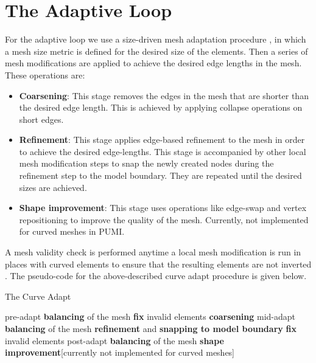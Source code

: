 \documentclass[review,12pt]{elsarticle_summary_report}
\begin{document}

\section{\label{adaptive_loop}The Adaptive Loop}

For the adaptive loop we use a size-driven mesh adaptation procedure \cite{LiShephard_03}, in which a mesh size metric is defined for the desired size of the elements. Then a series of mesh modifications are applied to achieve the desired edge lengths in the mesh. These operations are:
\begin{itemize}
  \item \textbf{Coarsening}: This stage removes the edges in the mesh that are shorter than the desired edge length. This is achieved by applying collapse operations on short edges.
  \item \textbf{Refinement}: This stage applies edge-based refinement to the mesh in order to achieve the desired edge-lengths. This stage is accompanied by other local mesh modification steps to snap the newly created nodes during the refinement step to the model boundary. They are repeated until the desired sizes are achieved.
  \item \textbf{Shape improvement}: This stage uses operations like edge-swap and vertex repositioning to improve the quality of the mesh. Currently, not implemented for curved meshes in PUMI.
\end{itemize}
A mesh validity check is performed anytime a local mesh modification is run in places with curved elements to ensure that the resulting elements are not inverted \cite[see][for more details]{LuoShephard_11}. The pseudo-code for the above-described curve adapt procedure is given below.

\begin{algorithm}
\caption{The Curve Adapt}\label{crv_adapt}
\begin{algorithmic}[1]
\State pre-adapt \textbf{balancing} of the mesh
\State \textbf{fix} invalid elements 
\State \textbf{coarsening}
\State mid-adapt \textbf{balancing} of the mesh
\State \textbf{refinement} and \textbf{snapping to model boundary}
\State \textbf{fix} invalid elements 
\State post-adapt \textbf{balancing} of the mesh
\State \textbf{shape improvement}[currently not implemented for curved meshes]
\EndProcedure
\end{algorithmic}
\end{algorithm}
\end{document}
